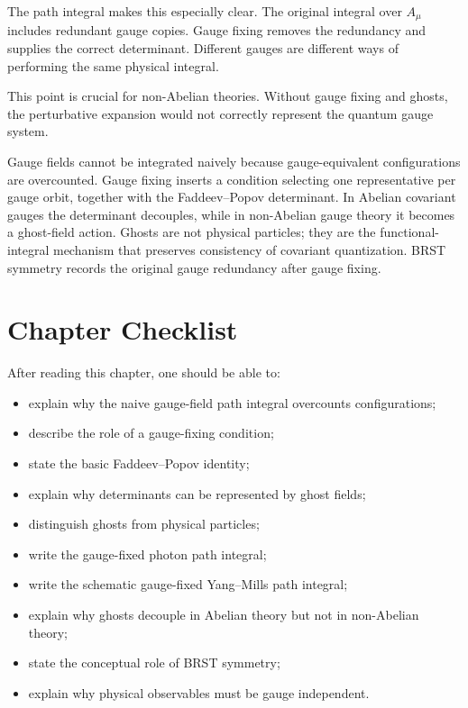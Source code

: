 The path integral makes this especially clear. The original integral over
\(A_\mu\) includes redundant gauge copies. Gauge fixing removes the redundancy
and supplies the correct determinant. Different gauges are different ways of
performing the same physical integral.

This point is crucial for non-Abelian theories. Without gauge fixing and ghosts,
the perturbative expansion would not correctly represent the quantum gauge
system.

\begin{summarybox}
Gauge fields cannot be integrated naively because gauge-equivalent
configurations are overcounted. Gauge fixing inserts a condition selecting one
representative per gauge orbit, together with the Faddeev--Popov determinant. In
Abelian covariant gauges the determinant decouples, while in non-Abelian gauge
theory it becomes a ghost-field action. Ghosts are not physical particles; they
are the functional-integral mechanism that preserves consistency of covariant
quantization. BRST symmetry records the original gauge redundancy after gauge
fixing.
\end{summarybox}

\section{Chapter Checklist}

After reading this chapter, one should be able to:
\begin{itemize}
    \item explain why the naive gauge-field path integral overcounts
    configurations;
    \item describe the role of a gauge-fixing condition;
    \item state the basic Faddeev--Popov identity;
    \item explain why determinants can be represented by ghost fields;
    \item distinguish ghosts from physical particles;
    \item write the gauge-fixed photon path integral;
    \item write the schematic gauge-fixed Yang--Mills path integral;
    \item explain why ghosts decouple in Abelian theory but not in non-Abelian
    theory;
    \item state the conceptual role of BRST symmetry;
    \item explain why physical observables must be gauge independent.
\end{itemize}
